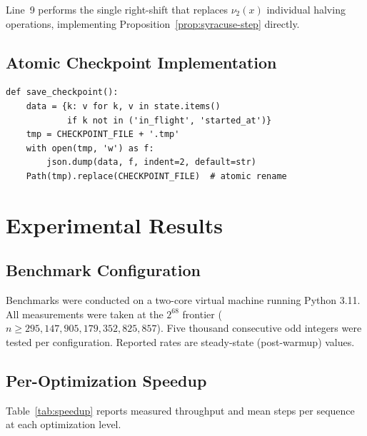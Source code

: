 \documentclass{mcom-l}
\theoremstyle{definition}
\theoremstyle{remark}
\numberwithin{equation}{section}
\newcommand{\vp}{\nu_2}              %
\begin{document}
Line~9 performs the single right-shift that replaces $\vp(x)$
individual halving operations, implementing
Proposition~\ref{prop:syracuse-step} directly.

\subsection{Atomic Checkpoint Implementation}

\begin{lstlisting}[caption={Atomic checkpoint write.},
                   label={lst:checkpoint}]
def save_checkpoint():
    data = {k: v for k, v in state.items()
            if k not in ('in_flight', 'started_at')}
    tmp = CHECKPOINT_FILE + '.tmp'
    with open(tmp, 'w') as f:
        json.dump(data, f, indent=2, default=str)
    Path(tmp).replace(CHECKPOINT_FILE)  # atomic rename
\end{lstlisting}

\section{Experimental Results}
\label{sec:results}

\subsection{Benchmark Configuration}

Benchmarks were conducted on a two-core virtual machine running Python
3.11.  All measurements were taken at the $2^{68}$ frontier ($n \geq
295{,}147{,}905{,}179{,}352{,}825{,}857$).  Five thousand consecutive
odd integers were tested per configuration.  Reported rates are
steady-state (post-warmup) values.

\subsection{Per-Optimization Speedup}

Table~\ref{tab:speedup} reports measured throughput and mean steps per
sequence at each optimization level.
\end{document}
